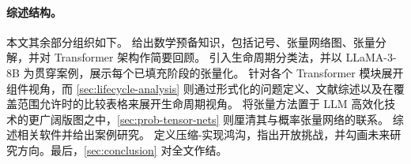 \paragraph{综述结构。}

本文其余部分组织如下。 给出数学预备知识，包括记号、张量网络图、张量分解，并对 Transformer 架构作简要回顾。 引入生命周期分类法，并以 LLaMA-3-8B 为贯穿案例，展示每个已填充阶段的张量化。 针对各个 Transformer 模块展开组件视角，而 \cref{sec:lifecycle-analysis} 则通过形式化的问题定义、文献综述以及在覆盖范围允许时的比较表格来展开生命周期视角。 将张量方法置于 LLM 高效化技术的更广阔版图之中，\cref{sec:prob-tensor-nets} 则厘清其与概率张量网络的联系。 综述相关软件并给出案例研究。 定义压缩-实现鸿沟，指出开放挑战，并勾画未来研究方向。最后，\cref{sec:conclusion} 对全文作结。


